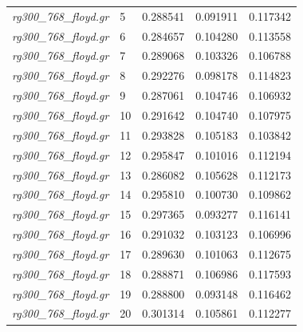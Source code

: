 \documentclass[12pt]{article}
\begin{document}
\begin{longtable}{l|l|lll}
\textit{rg300\_768\_floyd.gr}    &  5        & 0.288541               & 0.091911             & 0.117342                     \\
\textit{rg300\_768\_floyd.gr}    &  6        & 0.284657               & 0.104280             & 0.113558                     \\
\textit{rg300\_768\_floyd.gr}    &  7        & 0.289068               & 0.103326             & 0.106788                     \\
\textit{rg300\_768\_floyd.gr}    &  8        & 0.292276               & 0.098178             & 0.114823                     \\
\textit{rg300\_768\_floyd.gr}    &  9        & 0.287061               & 0.104746             & 0.106932                     \\
\textit{rg300\_768\_floyd.gr}    &  10       & 0.291642               & 0.104740             & 0.107975                     \\
\textit{rg300\_768\_floyd.gr}    &  11       & 0.293828               & 0.105183             & 0.103842                     \\
\textit{rg300\_768\_floyd.gr}    &  12       & 0.295847               & 0.101016             & 0.112194                     \\
\textit{rg300\_768\_floyd.gr}    &  13       & 0.286082               & 0.105628             & 0.112173                     \\
\textit{rg300\_768\_floyd.gr}    &  14       & 0.295810               & 0.100730             & 0.109862                     \\
\textit{rg300\_768\_floyd.gr}    &  15       & 0.297365               & 0.093277             & 0.116141                     \\
\textit{rg300\_768\_floyd.gr}    &  16       & 0.291032               & 0.103123             & 0.106996                     \\
\textit{rg300\_768\_floyd.gr}    &  17       & 0.289630               & 0.101063             & 0.112675                     \\
\textit{rg300\_768\_floyd.gr}    &  18       & 0.288871               & 0.106986             & 0.117593                     \\
\textit{rg300\_768\_floyd.gr}    &  19       & 0.288800               & 0.093148             & 0.116462                     \\
\textit{rg300\_768\_floyd.gr}    &  20       & 0.301314               & 0.105861             & 0.112277                     \\ \hline              

\end{longtable}
\end{document}
